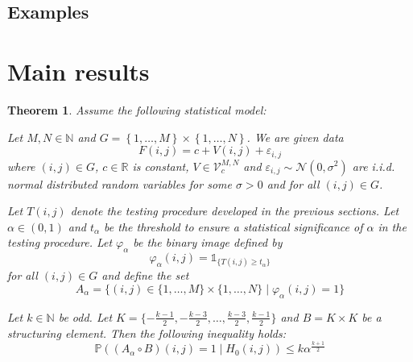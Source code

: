 \documentclass[a4paper,12pt]{article}
\theoremstyle{plain}
\newtheorem{theorem}{Theorem}[section]
\theoremstyle{definition}
\theoremstyle{remark}
\begin{document}
\newpage

\subsection{Examples}

\newpage

\section{Main results}

\begin{theorem}
	Assume the following statistical model:
	
	Let $M, N \in \mathbb{N}$ and $G = \left\{ 1, \dots, M \right\} \times  \left\{ 1, \dots, N \right\}$. We are given data
	\begin{equation}\label{f}
		F(i, j) = c + V(i, j) + \varepsilon_{i, j}
	\end{equation}
	where $(i, j) \in G$, $c \in \mathbb{R}$ is constant, $V \in \mathcal{V}_c^{M, N}$ and $\varepsilon_{i, j} \sim \mathcal{N}(0, \sigma^2)$ are i.i.d. normal distributed random variables for some $\sigma > 0$ and for all $(i, j) \in G$.
	
	Let $T(i, j)$ denote the testing procedure developed in the previous sections. Let $\alpha \in (0, 1)$ and $t_\alpha$ be the threshold to ensure a statistical significance of $\alpha$ in the testing procedure. Let $\varphi_\alpha$ be the binary image defined by
	\begin{equation}
		\varphi_\alpha(i, j) = \mathds{1}_{ \{ T(i, j) \geq t_\alpha \} }
	\end{equation}
	for all $(i, j) \in G$ and define the set
	\begin{equation}
		A_\alpha = \{ (i, j) \in \{ 1, \dots, M \} \times \{ 1, \dots, N \} \mid \varphi_\alpha(i, j) = 1 \}
	\end{equation}
	
	Let $k \in \mathbb{N}$ be odd. Let $K = \{ -\frac{k - 1}{2}, -\frac{k - 3}{2}, \dots, \frac{k - 3}{2}, \frac{k - 1}{2} \}$ and $B = K \times K$ be a structuring element.
	Then the following inequality holds:
	\begin{equation*}
		\mathbb{P}((A_\alpha \circ B)(i, j) = 1 \mid H_0(i, j)) \leq k \alpha^{\frac{k+1}{2}}
	\end{equation*}
\end{theorem}
\end{document}

